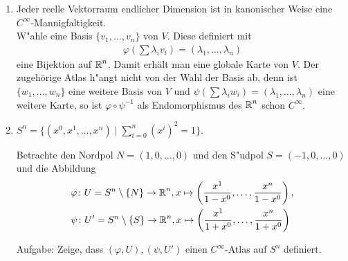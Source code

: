 \begin{bsp}
\begin{enumerate}
  \item Jeder reelle Vektorraum endlicher Dimension ist in kanonischer Weise eine $C^{\infty}$-Mannigfaltigkeit.\\
    W"ahle eine Basis $\{v_1, \ldots, v_n\}$ von $V$. Diese definiert mit
    \begin{align*}
      \varphi\left(\sum\lambda_iv_i\right) = (\lambda_1, \ldots, \lambda_n)
    \end{align*}
    eine Bijektion auf $\operatorname{\mathbb{R}}^n$. Damit erhält man eine globale Karte von $V$.
    Der zugehörige Atlas h"angt nicht von der Wahl der Basis ab, denn ist $\{w_1, \ldots, w_n\}$ eine weitere Basis von $V$ und $\psi(\sum \lambda_iw_i) = (\lambda_1, \ldots, \lambda_n)$ eine weitere Karte, so ist $\varphi \circ \psi^{-1}$ als Endomorphismus des $\operatorname{\mathbb{R}}^n$ schon $C^{\infty}$.

  \item $S^n = \{(x^0, x^1, \ldots, x^n) \mid \sum_{i = 0}^n(x^{i})^2 = 1\}$.\\

    
    Betrachte den Nordpol $N = (1,0,\ldots,0)$ und den S"udpol $S = (-1,0,\ldots,0)$ und die Abbildung
    \begin{align*}
      & \varphi \colon U = S^{n}\setminus\{N\} \to \operatorname{\mathbb{R}}^n, x \mapsto \left(\frac{x^1}{1-x^0}, \ldots, \frac{x^{n}}{1-x^0}\right),\\
      & \psi \colon U' = S^{n} \setminus \{S\} \to \operatorname{\mathbb{R}}^n, x \mapsto \left(\frac{x^1}{1+x^0}, \ldots, \frac{x^n}{1+x^0}\right)
    \end{align*}

    Aufgabe: Zeige, dass $(\varphi, U), (\psi, U')$ einen $C^{\infty}$-Atlas auf $S^n$ definiert.

  \end{enumerate}
\end{bsp}


